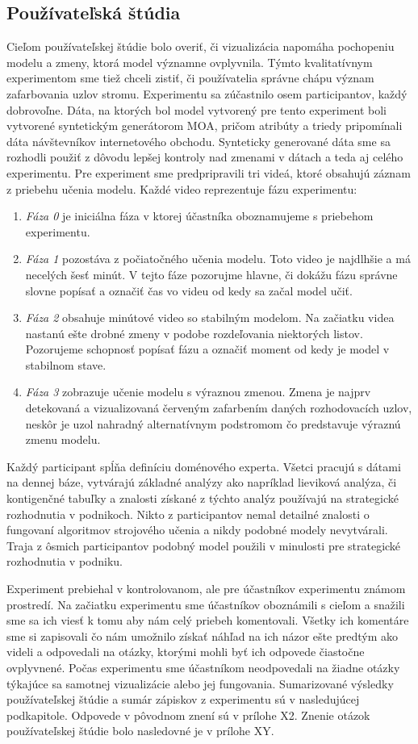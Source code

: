 \subsection{Používateľská štúdia}
Cieľom používateľskej štúdie bolo overiť, či vizualizácia napomáha pochopeniu modelu a zmeny, ktorá model významne ovplyvnila. Týmto kvalitatívnym experimentom sme tiež chceli zistiť, či používatelia správne chápu význam zafarbovania uzlov stromu. Experimentu sa zúčastnilo osem participantov, každý dobrovoľne. Dáta, na ktorých bol model vytvorený pre tento experiment boli vytvorené syntetickým generátorom MOA, pričom atribúty a triedy pripomínali dáta návštevníkov internetového obchodu. Synteticky generované dáta sme sa rozhodli použiť z dôvodu lepšej kontroly nad zmenami v dátach a teda aj celého experimentu. Pre experiment sme predpripravili tri videá, ktoré obsahujú záznam z priebehu učenia modelu. Každé video reprezentuje fázu experimentu:
\begin{enumerate}
	\item \textit{Fáza 0} je iniciálna fáza v ktorej účastníka oboznamujeme s priebehom experimentu.
	\item \textit{Fáza 1} pozostáva z počiatočného učenia modelu. Toto video je najdlhšie a má necelých šesť minút. V tejto fáze pozorujme hlavne, či dokážu fázu správne slovne popísať a označiť čas vo videu od kedy sa začal model učiť.
	\item \textit{Fáza 2} obsahuje minútové video so stabilným modelom. Na začiatku videa nastanú ešte drobné zmeny v podobe rozdeľovania niektorých listov. Pozorujeme schopnosť popísať fázu a označiť moment od kedy je model v stabilnom stave.
	\item \textit{Fáza 3} zobrazuje učenie modelu s výraznou zmenou. Zmena je najprv detekovaná a vizualizovaná červeným zafarbením daných rozhodovacích uzlov, neskôr je uzol nahradný alternatívnym podstromom čo predstavuje výraznú zmenu modelu.
\end{enumerate}
Každý participant spĺňa definíciu doménového experta. Všetci pracujú s dátami na dennej báze, vytvárajú základné analýzy ako napríklad lieviková analýza, či kontigenčné tabuľky a znalosti získané z týchto analýz používajú na strategické rozhodnutia v podnikoch. Nikto z participantov nemal detailné znalosti o fungovaní algoritmov strojového učenia a nikdy podobné modely nevytvárali. Traja z ôsmich participantov podobný model použili v minulosti pre strategické rozhodnutia v podniku.
\par
Experiment prebiehal v kontrolovanom, ale pre účastníkov experimentu známom prostredí. Na začiatku experimentu sme účastníkov oboznámili s cieľom a snažili sme sa ich viesť k tomu aby nám celý priebeh komentovali. Všetky ich komentáre sme si zapisovali čo nám umožnilo získať náhľad na ich názor ešte predtým ako videli a odpovedali na otázky, ktorými mohli byť ich odpovede čiastočne ovplyvnené. Počas experimentu sme účastníkom neodpovedali na žiadne otázky týkajúce sa samotnej vizualizácie alebo jej fungovania. Sumarizované výsledky používateľskej štúdie a sumár zápiskov z experimentu sú v nasledujúcej podkapitole. Odpovede v pôvodnom znení sú v prílohe X2. Znenie otázok používateľskej štúdie bolo nasledovné je v prílohe XY.
